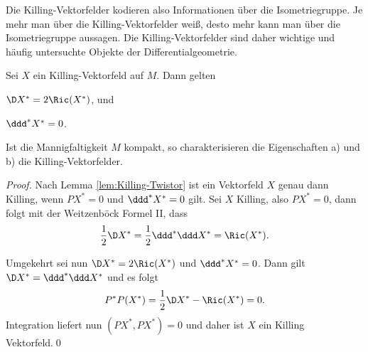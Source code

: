 \documentclass[%
	paper=a5,%
	fleqn,%
	DIV=18,%
	BCOR=0mm,
	fontsize=11pt,
	titlepage=false,%
	bibliography=totoc,
	DIV=18,%
	twoside=true,
	pdftitle=Riemannsche Geometrie,
	pdfauthor=Uwe Semmelmann,
	numbers=noendperiod]%
	{scrbook}
\begin{document}
Die Killing-Vektorfelder kodieren also Informationen über die Isometriegruppe. Je mehr man über die Killing-Vektorfelder weiß, desto mehr kann man über die Isometriegruppe aussagen. Die Killing-Vektorfelder sind daher wichtige und häufig untersuchte Objekte der Differentialgeometrie.


\begin{cor}
Sei $X$ ein Killing-Vektorfeld auf $M$. Dann gelten
\begin{propenum}
\item $\D X^* = 2\Ric(X^*)$, und
\item $\ddd^* X^*  = 0$.\fish
\end{propenum}
Ist die Mannigfaltigkeit $M$ kompakt, so charakterisieren die Eigenschaften a) und b) die Killing-Vektorfelder.\fish
\end{cor}
\begin{proof}
Nach Lemma \ref{lem:Killing-Twistor} ist ein Vektorfeld $X$ genau dann Killing, wenn $PX^* = 0$ und $\ddd^* X^* = 0$ gilt. 
Sei $X$ Killing, also $PX^* = 0$, dann folgt mit der Weitzenböck Formel II, dass
\begin{align*}
\frac{1}{2}\D X^* = \frac{1}{2}\ddd^*\ddd X^* = \Ric(X^*).
\end{align*}

Umgekehrt sei nun $\D X^* = 2\Ric(X^*)$ und $\ddd^* X^* = 0$. Dann gilt $\D X^* = \ddd^*\ddd X^* $ und es folgt
\begin{align*}
P^*P(X^*) = \frac{1}{2}\D X^* - \Ric(X^*) = 0.
\end{align*}
Integration liefert nun $(PX^*,PX^*) = 0$ und daher ist $X$ ein Killing Vektorfeld.\qed
\end{proof}
\end{document}
